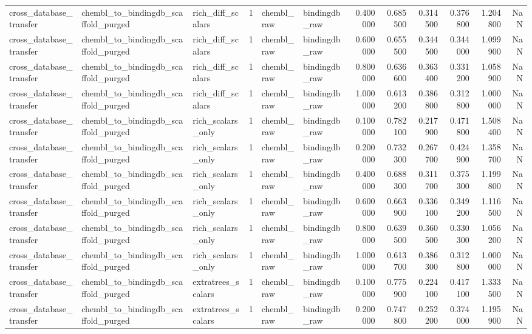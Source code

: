 \begin{longtable}{lllrllrrrrrr}
cross\_database\_transfer & chembl\_to\_bindingdb\_scaffold\_purged & rich\_diff\_scalars & 1 & chembl\_raw & bindingdb\_raw & 0.400000 & 0.685500 & 0.314500 & 0.376800 & 1.204800 & NaN \\
cross\_database\_transfer & chembl\_to\_bindingdb\_scaffold\_purged & rich\_diff\_scalars & 1 & chembl\_raw & bindingdb\_raw & 0.600000 & 0.655500 & 0.344500 & 0.344000 & 1.099900 & NaN \\
cross\_database\_transfer & chembl\_to\_bindingdb\_scaffold\_purged & rich\_diff\_scalars & 1 & chembl\_raw & bindingdb\_raw & 0.800000 & 0.636600 & 0.363400 & 0.331200 & 1.058900 & NaN \\
cross\_database\_transfer & chembl\_to\_bindingdb\_scaffold\_purged & rich\_diff\_scalars & 1 & chembl\_raw & bindingdb\_raw & 1.000000 & 0.613200 & 0.386800 & 0.312800 & 1.000000 & NaN \\
cross\_database\_transfer & chembl\_to\_bindingdb\_scaffold\_purged & rich\_scalars\_only & 1 & chembl\_raw & bindingdb\_raw & 0.100000 & 0.782100 & 0.217900 & 0.471800 & 1.508400 & NaN \\
cross\_database\_transfer & chembl\_to\_bindingdb\_scaffold\_purged & rich\_scalars\_only & 1 & chembl\_raw & bindingdb\_raw & 0.200000 & 0.732300 & 0.267700 & 0.424900 & 1.358700 & NaN \\
cross\_database\_transfer & chembl\_to\_bindingdb\_scaffold\_purged & rich\_scalars\_only & 1 & chembl\_raw & bindingdb\_raw & 0.400000 & 0.688300 & 0.311700 & 0.375300 & 1.199800 & NaN \\
cross\_database\_transfer & chembl\_to\_bindingdb\_scaffold\_purged & rich\_scalars\_only & 1 & chembl\_raw & bindingdb\_raw & 0.600000 & 0.663900 & 0.336100 & 0.349200 & 1.116500 & NaN \\
cross\_database\_transfer & chembl\_to\_bindingdb\_scaffold\_purged & rich\_scalars\_only & 1 & chembl\_raw & bindingdb\_raw & 0.800000 & 0.639500 & 0.360500 & 0.330300 & 1.056200 & NaN \\
cross\_database\_transfer & chembl\_to\_bindingdb\_scaffold\_purged & rich\_scalars\_only & 1 & chembl\_raw & bindingdb\_raw & 1.000000 & 0.613700 & 0.386300 & 0.312800 & 1.000000 & NaN \\
cross\_database\_transfer & chembl\_to\_bindingdb\_scaffold\_purged & extratrees\_scalars & 1 & chembl\_raw & bindingdb\_raw & 0.100000 & 0.775900 & 0.224100 & 0.417100 & 1.333500 & NaN \\
cross\_database\_transfer & chembl\_to\_bindingdb\_scaffold\_purged & extratrees\_scalars & 1 & chembl\_raw & bindingdb\_raw & 0.200000 & 0.747800 & 0.252200 & 0.374000 & 1.195900 & NaN \\

\end{longtable}
